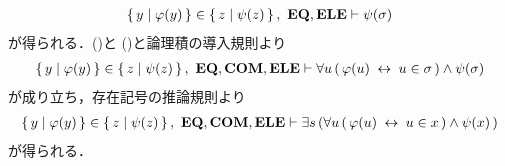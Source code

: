 \begin{sketch}
\begin{align}
			\left\{\, y \mid \varphi(y)\, \right\} \in \left\{\, z \mid \psi(z)\, \right\},\ \mbox{{\bf EQ}},\mbox{{\bf ELE}} \vdash 
			\psi(\sigma)
			\label{fom:equivalent_formula_rewriting_11_3}
		\end{align}
		が得られる．()と
		()と論理積の導入規則より
		\begin{align}
			\Set{y}{\varphi(y)} \in \Set{z}{\psi(z)},\ \EQAX,\COMAX,\ELEAX \vdash
			\forall u\, (\, \varphi(u) \lrarrow u \in \sigma\, ) \wedge \psi(\sigma)
		\end{align}
		が成り立ち，存在記号の推論規則より
		\begin{align}
			\Set{y}{\varphi(y)} \in \Set{z}{\psi(z)},\ \EQAX,\COMAX,\ELEAX \vdash
			\exists s\, (\forall u\, (\, \varphi(u) \lrarrow u \in x\, ) \wedge \psi(x)\, )
		\end{align}
		が得られる．
		\QED
	\end{sketch}